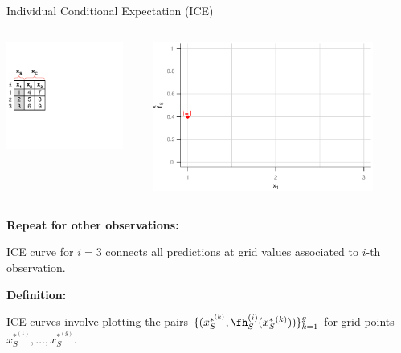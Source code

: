 \documentclass[11pt,compress,t,notes=noshow, aspectratio=169, xcolor=table]{beamer}
\begin{document}
\begin{frame}{Individual Conditional Expectation (ICE)}

\begin{columns}[T]
\begin{column}{0.4\textwidth}
\includegraphics[page=7, trim=0cm 0.35cm 0.85cm 0.35cm, width=0.9\textwidth]{figure_man/ice_plot_demo}
\end{column}
\begin{column}{0.55\textwidth}
\includegraphics[page=5, width=0.85\textwidth]{figure/ICE}
\end{column}
\end{columns}
\vspace*{\topsep}

\textbf{Repeat for other observations:}

ICE curve for $i=3$ connects all predictions at grid values associated to $i$-th observation.

\textbf{Definition:}

ICE curves involve plotting the pairs $ \{(x_S^{*^{(k)}}, \fh_{S}^{(i)}(x_S^*{^{(k)}})) \}_{k=1}^g $ for grid points $x_S^{*^{(1)}}, \dots, x_S^{*^{(g)}}$.
\end{frame}
\end{document}
